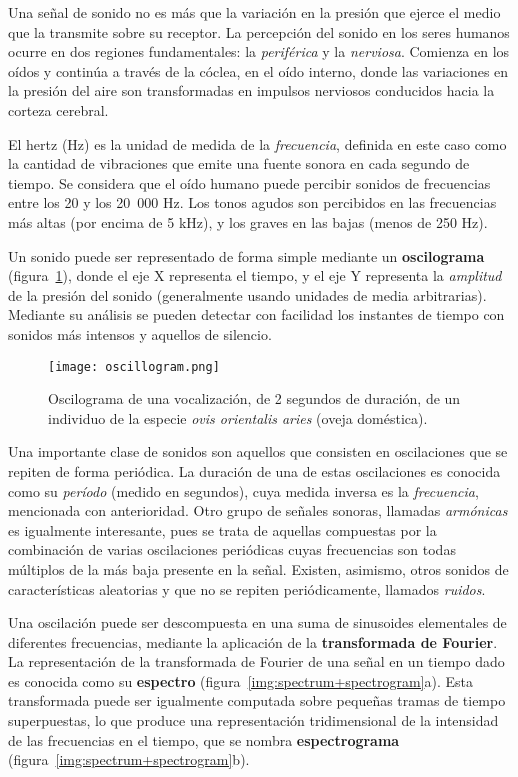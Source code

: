 Una señal de sonido no es más que la variación en la presión que ejerce el medio que la transmite sobre su receptor.
La percepción del sonido en los seres humanos ocurre en dos regiones fundamentales: la \textit{periférica} y la \textit{nerviosa}.
Comienza en los oídos y continúa a través de la cóclea, en el oído interno, donde las variaciones en la presión del aire son transformadas en impulsos nerviosos conducidos hacia la corteza cerebral.

El hertz (Hz) es la unidad de medida de la \textit{frecuencia}, definida en este caso como la cantidad de vibraciones que emite una fuente sonora en cada segundo de tiempo.
Se considera que el oído humano puede percibir sonidos de frecuencias entre los 20 y los 20~000 Hz.
Los tonos agudos son percibidos en las frecuencias más altas (por encima de 5 kHz), y los graves en las bajas (menos de 250 Hz).

Un sonido puede ser representado de forma simple mediante un \textbf{oscilograma} (figura~\ref{img:oscillogram}), donde el eje X representa el tiempo, y el eje Y representa la \textit{amplitud} de la presión del sonido (generalmente usando unidades de media arbitrarias).
Mediante su análisis se pueden detectar con facilidad los instantes de tiempo con sonidos más intensos y aquellos de silencio.

\begin{figure}[!h]
    \centering
    \texttt{[image: oscillogram.png]}
    \caption{Oscilograma de una vocalización, de 2 segundos de duración, de un individuo de la especie \textit{ovis orientalis aries} (oveja doméstica).}
    \label{img:oscillogram}
\end{figure}

Una importante clase de sonidos son aquellos que consisten en oscilaciones que se repiten de forma periódica.
La duración de una de estas oscilaciones es conocida como su \textit{período} (medido en segundos), cuya medida inversa es la \textit{frecuencia}, mencionada con anterioridad.
Otro grupo de señales sonoras, llamadas \textit{armónicas} es igualmente interesante, pues se trata de aquellas compuestas por la combinación de varias oscilaciones periódicas cuyas frecuencias son todas múltiplos de la más baja presente en la señal.
Existen, asimismo, otros sonidos de características aleatorias y que no se repiten periódicamente, llamados \textit{ruidos}.

Una oscilación puede ser descompuesta en una suma de sinusoides elementales de diferentes frecuencias, mediante la aplicación de la \textbf{transformada de Fourier}.
La representación de la transformada de Fourier de una señal en un tiempo dado es conocida como su \textbf{espectro} (figura~\ref{img:spectrum+spectrogram}a).
Esta transformada puede ser igualmente computada sobre pequeñas tramas de tiempo superpuestas, lo que produce una representación tridimensional de la intensidad de las frecuencias en el tiempo, que se nombra \textbf{espectrograma} (figura~\ref{img:spectrum+spectrogram}b).

